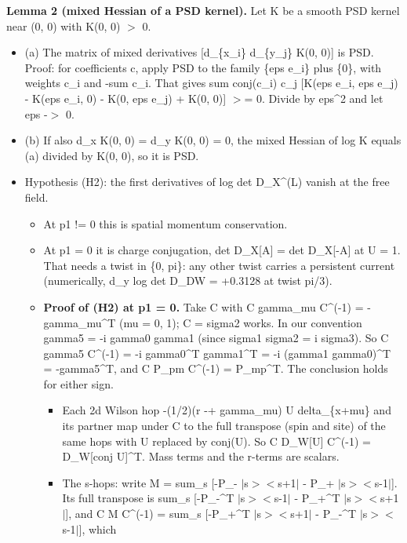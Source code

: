 \documentclass[11pt,a4paper]{article}
\begin{document}
{\bfseries\boldmath Lemma 2 (mixed Hessian of a PSD kernel).} Let K be a smooth PSD kernel near (0, 0) with K(0, 0) $>$ 0.

\begin{itemize}
\item{} (a) The matrix of mixed derivatives [d\_\{x\_i\} d\_\{y\_j\} K(0, 0)] is PSD. Proof: for coefficients c, apply PSD to the
family \{eps e\_i\} plus \{0\}, with weights c\_i and -sum c\_i. That gives
sum conj(c\_i) c\_j [K(eps e\_i, eps e\_j) - K(eps e\_i, 0) - K(0, eps e\_j) + K(0, 0)] $>$= 0. Divide by eps\textasciicircum{}2 and let
eps -$>$ 0.
\item{} (b) If also d\_x K(0, 0) = d\_y K(0, 0) = 0, the mixed Hessian of log K equals (a) divided by K(0, 0), so it is PSD.
\item{} Hypothesis (H2): the first derivatives of log det D\_X\textasciicircum{}(L) vanish at the free field.
\begin{itemize}
\item{} At p1 != 0 this is spatial momentum conservation.
\item{} At p1 = 0 it is charge conjugation, det D\_X[A] = det D\_X[-A] at U = 1. That needs a twist in \{0, pi\}: any other
twist carries a persistent current (numerically, d\_y log det D\_DW = +0.3128 at twist pi/3).
\item{} {\bfseries\boldmath Proof of (H2) at p1 = 0.} Take C with C gamma\_mu C\textasciicircum{}(-1) =
-gamma\_mu\textasciicircum{}T (mu = 0, 1); C = sigma2 works. In our convention gamma5 = -i gamma0 gamma1 (since
sigma1 sigma2 = i sigma3). So C gamma5 C\textasciicircum{}(-1) = -i gamma0\textasciicircum{}T gamma1\textasciicircum{}T = -i (gamma1 gamma0)\textasciicircum{}T = -gamma5\textasciicircum{}T, and
C P\_pm C\textasciicircum{}(-1) = P\_mp\textasciicircum{}T. The conclusion holds for either sign.
\begin{itemize}
\item{} Each 2d Wilson hop -(1/2)(r -+ gamma\_mu) U delta\_\{x+mu\} and its partner map under C to the full transpose
(spin and site) of the same hops with U replaced by conj(U). So C D\_W[U] C\textasciicircum{}(-1) = D\_W[conj U]\textasciicircum{}T. Mass terms
and the r-terms are scalars.
\item{} The s-hops: write M = sum\_s [-P\_- $|$s$>$$<$s+1$|$ - P\_+ $|$s$>$$<$s-1$|$]. Its full transpose is
sum\_s [-P\_-\textasciicircum{}T $|$s$>$$<$s-1$|$ - P\_+\textasciicircum{}T $|$s$>$$<$s+1$|$], and C M C\textasciicircum{}(-1) = sum\_s [-P\_+\textasciicircum{}T $|$s$>$$<$s+1$|$ - P\_-\textasciicircum{}T $|$s$>$$<$s-1$|$], which

\end{itemize}
\end{itemize}
\end{itemize}
\end{document}
